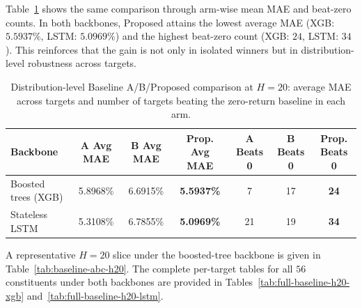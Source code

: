 \documentclass[12pt,a4paper,titlepage]{article}
\begin{document}
Table~\ref{tab:baseline-abc-h20-avg} shows the same comparison through arm-wise mean MAE and beat-zero counts. In both backbones, Proposed attains the lowest average MAE (XGB: \(5.5937\%\), LSTM: \(5.0969\%\)) and the highest beat-zero count (XGB: \(24\), LSTM: \(34\)). This reinforces that the gain is not only in isolated winners but in distribution-level robustness across targets.

\begin{table}[htbp]
\centering
\small
\caption{Distribution-level Baseline A/B/Proposed comparison at \(H=20\): average MAE across targets and number of targets beating the zero-return baseline in each arm.}
\label{tab:baseline-abc-h20-avg}
\begin{tabular}{lcccccc}
\toprule
Backbone & A Avg MAE & B Avg MAE & Prop. Avg MAE & A Beats 0 & B Beats 0 & Prop. Beats 0 \\
\midrule
Boosted trees (XGB) & 5.8968\% & 6.6915\% & \textbf{5.5937\%} & 7 & 17 & \textbf{24} \\
Stateless LSTM      & 5.3108\% & 6.7855\% & \textbf{5.0969\%} & 21 & 19 & \textbf{34} \\
\bottomrule
\end{tabular}
\end{table}

A representative \(H=20\) slice under the boosted-tree backbone is given in Table~\ref{tab:baseline-abc-h20}. The complete per-target tables for all \(56\) constituents under both backbones are provided in Tables~\ref{tab:full-baseline-h20-xgb} and~\ref{tab:full-baseline-h20-lstm}.
\end{document}
